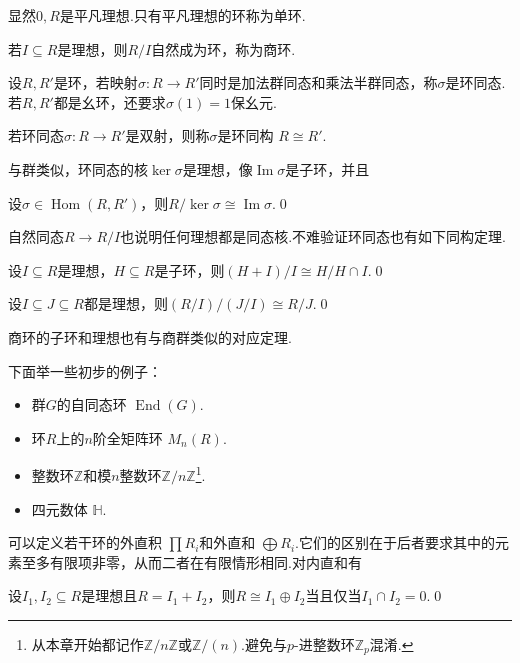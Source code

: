 显然$0,R$是{\heiti 平凡理想}.只有平凡理想的环称为{\heiti 单环}.

若$I\subseteq R$是理想，则$R/I$自然成为环，称为{\heiti 商环}.

\begin{definition}
    设$R,R'$是环，若映射$\sigma\colon R\to R'$同时是加法群同态和乘法半群同态，称$\sigma$是{\heiti 环同态}.若$R,R'$都是幺环，还要求$\sigma(1)=1$保幺元.

    若环同态$\sigma\colon R\to R'$是双射，则称$\sigma$是{\heiti 环同构} $R\cong R'$.
\end{definition}

与群类似，环同态的核$\ker\sigma$是理想，像$\operatorname*{Im}\sigma$是子环，并且
\begin{thm}[(环同态基本定理)]
    设$\sigma\in\operatorname*{Hom}(R,R')$，则$R/\ker\sigma\cong\operatorname*{Im}\sigma$.\qed
\end{thm}

自然同态$R\to R/I$也说明任何理想都是同态核.不难验证环同态也有如下同构定理.
\begin{thm}[(第一环同构)]
    设$I\subseteq R$是理想，$H\subseteq R$是子环，则$(H+I)/I\cong H/H\cap I$.\qed
\end{thm}
\begin{thm}[(第二环同构)]
    设$I\subseteq J\subseteq R$都是理想，则$(R/I)/(J/I)\cong R/J$.\qed
\end{thm}

商环的子环和理想也有与商群类似的对应定理.

下面举一些初步的例子：
\begin{itemize}
    \item 群$G$的{\heiti 自同态环} $\operatorname*{End}(G)$.
    \item 环$R$上的$n$阶{\heiti 全矩阵环} $M_n(R)$.
    \item 整数环$\mathbb{Z}$和模$n$整数环$\mathbb{Z}/n\mathbb{Z}$\footnote{从本章开始都记作$\mathbb{Z}/n\mathbb{Z}$或$\mathbb{Z}/(n)$.避免与$p$-进整数环$\mathbb{Z}_p$混淆.}.
    \item {\heiti 四元数体} $\mathbb{H}$.
\end{itemize}

可以定义若干环的{\heiti 外直积} $\prod R_i$和{\heiti 外直和} $\bigoplus R_i$.它们的区别在于后者要求其中的元素至多有限项非零，从而二者在有限情形相同.对内直和有
\begin{prop}
    设$I_1,I_2\subseteq R$是理想且$R=I_1+I_2$，则$R\cong I_1\oplus I_2$当且仅当$I_1\cap I_2=0$.\qed
\end{prop}

